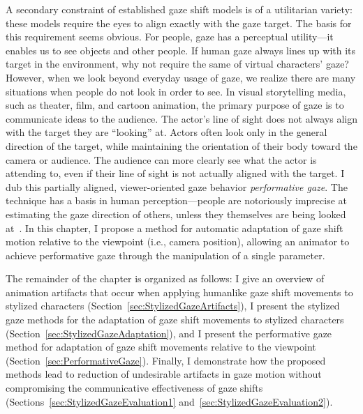 A secondary constraint of established gaze shift models is of a utilitarian variety: these models require the eyes to align exactly with the gaze target. The basis for this requirement seems obvious. For people, gaze has a perceptual utility---it enables us to see objects and other people. If human gaze always lines up with its target in the environment, why not require the same of virtual characters' gaze?
However, when we look beyond everyday usage of gaze, we realize there are many situations when people do not look in order to see.
In visual storytelling media, such as theater, film, and cartoon animation, the primary purpose of gaze is to communicate ideas to the audience. The actor's line of sight does not always align with the target they are ``looking'' at. Actors often look only in the general direction of the target, while maintaining the orientation of their body toward the camera or audience. The audience can more clearly see what the actor is attending to, even if their line of sight is not actually aligned with the target.
I dub this partially aligned, viewer-oriented gaze behavior \emph{performative gaze}. The technique has a basis in human perception---people are notoriously imprecise at estimating the gaze direction of others, unless they themselves are being looked at~\citep{argyle1976gaze}. In this chapter, I propose a method for automatic adaptation of gaze shift motion relative to the viewpoint (i.e., camera position), allowing an animator to achieve performative gaze through the manipulation of a single parameter.

The remainder of the chapter is organized as follows: I give an overview of animation artifacts that occur when applying humanlike gaze shift movements to stylized characters (Section~\ref{sec:StylizedGazeArtifacts}), I present the stylized gaze methods for the adaptation of gaze shift movements to stylized characters (Section~\ref{sec:StylizedGazeAdaptation}), and I present the performative gaze method for adaptation of gaze shift movements relative to the viewpoint (Section~\ref{sec:PerformativeGaze}). Finally, I demonstrate how the proposed methods lead to reduction of undesirable artifacts in gaze motion without compromising the communicative effectiveness of gaze shifts (Sections~\ref{sec:StylizedGazeEvaluation1} and~\ref{sec:StylizedGazeEvaluation2}). 
